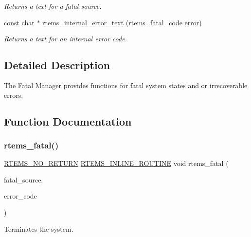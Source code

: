 \begin{DoxyCompactItemize}
\begin{DoxyCompactList}\small\item\em Returns a text for a fatal source. \end{DoxyCompactList}\item 
const char $\ast$ \mbox{\hyperlink{group__ClassicFatal_gacfd23116189b78bc2915c9c409179511}{rtems\+\_\+internal\+\_\+error\+\_\+text}} (rtems\+\_\+fatal\+\_\+code error)
\begin{DoxyCompactList}\small\item\em Returns a text for an internal error code. \end{DoxyCompactList}\end{DoxyCompactItemize}


\subsection{Detailed Description}
The Fatal Manager provides functions for fatal system states and or irrecoverable errors. 



\subsection{Function Documentation}
\mbox{\label{group__ClassicFatal_ga53fa9338246642e0d931f61314c6609e}} 
\subsubsection{\texorpdfstring{rtems\_fatal()}{rtems\_fatal()}}
{\footnotesize\ttfamily \mbox{\hyperlink{group__RTEMSScoreBaseDefs_gaa2f0ed67aa174f684bb31b7e8bdb386f}{R\+T\+E\+M\+S\+\_\+\+N\+O\+\_\+\+R\+E\+T\+U\+RN}} \mbox{\hyperlink{group__RTEMSScoreBaseDefs_gac216239df231d5dbd15e3520b0b9313f}{R\+T\+E\+M\+S\+\_\+\+I\+N\+L\+I\+N\+E\+\_\+\+R\+O\+U\+T\+I\+NE}} void rtems\+\_\+fatal (\begin{DoxyParamCaption}\item[{\mbox{\hyperlink{group__RTEMSScoreIntErr_ga878b4de77df7d0b83d19609d4de42c26}{rtems\+\_\+fatal\+\_\+source}}}]{fatal\+\_\+source,  }\item[{rtems\+\_\+fatal\+\_\+code}]{error\+\_\+code }\end{DoxyParamCaption})}



Terminates the system. 


